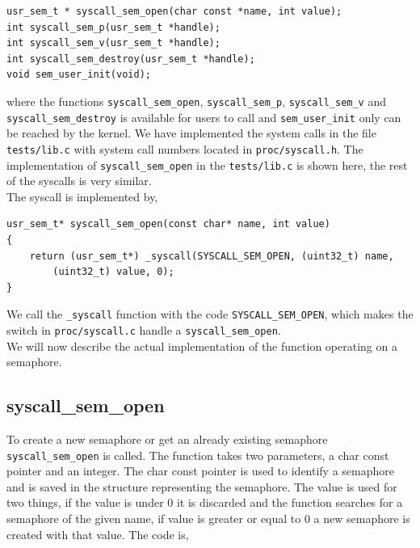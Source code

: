 \documentclass[11pt]{article}
\begin{document}
    \begin{lstlisting}[style=customc]
usr_sem_t * syscall_sem_open(char const *name, int value);
int syscall_sem_p(usr_sem_t *handle);
int syscall_sem_v(usr_sem_t *handle);
int syscall_sem_destroy(usr_sem_t *handle);
void sem_user_init(void);
    \end{lstlisting}

    where the functions \texttt{syscall\_sem\_open}, \texttt{syscall\_sem\_p},
    \texttt{syscall\_sem\_v} and \texttt{syscall\_sem\_destroy} is available for
    users to call and \texttt{sem\_user\_init} only can be reached by the
    kernel.  We have implemented the system calls in the file
    \texttt{tests/lib.c} with system call numbers located in
    \texttt{proc/syscall.h}.  The implementation of \texttt{syscall\_sem\_open}
    in the \texttt{tests/lib.c} is shown here, the rest of the syscalls is very
    similar. \\

    The syscall is implemented by,

    \begin{lstlisting}[style=customc]
usr_sem_t* syscall_sem_open(const char* name, int value)
{
    return (usr_sem_t*) _syscall(SYSCALL_SEM_OPEN, (uint32_t) name,
        (uint32_t) value, 0);
}
    \end{lstlisting}

    We call the \texttt{\_syscall} function with the code
    \texttt{SYSCALL\_SEM\_OPEN}, which makes the switch in
    \texttt{proc/syscall.c} handle a \texttt{syscall\_sem\_open}. \\

    We will now describe the actual implementation of the function operating on
    a semaphore.

    \subsection{syscall\_sem\_open}
    To create a new semaphore or get an already existing semaphore
    \texttt{syscall\_sem\_open} is called.  The function takes two parameters,
    a char const pointer and an integer.  The char const pointer is used to
    identify a semaphore and is saved in the structure representing the
    semaphore.  The value is used for two things, if the value is under 0 it is
    discarded and the function searches for a semaphore of the given name, if
    value is greater or equal to 0 a new semaphore is created with that value.
    The code is,
\end{document}
